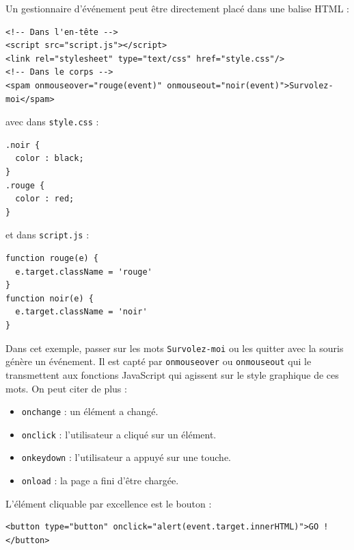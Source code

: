 Un gestionnaire d'événement peut être directement placé dans une balise HTML :

\vspace{-2ex}
\begin{verbatim}
<!-- Dans l'en-tête -->
<script src="script.js"></script>
<link rel="stylesheet" type="text/css" href="style.css"/>
<!-- Dans le corps -->
<spam onmouseover="rouge(event)" onmouseout="noir(event)">Survolez-moi</spam>
\end{verbatim}

\vspace{-2ex}
\begin{multicols}{2}
avec dans \texttt{style.css} :

\vspace{-2ex}
\begin{verbatim}
.noir { 
  color : black; 
}
.rouge { 
  color : red; 
}
\end{verbatim}


et dans \texttt{script.js} :

\vspace{-2ex}
\begin{verbatim}
function rouge(e) {
  e.target.className = 'rouge'
} 
function noir(e) {
  e.target.className = 'noir'
}
\end{verbatim}

\end{multicols}

Dans cet exemple, passer sur les mots \texttt{Survolez-moi} ou les quitter avec la souris génère un événement. Il est capté par \texttt{onmouseover} ou \texttt{onmouseout} qui le transmettent aux fonctions JavaScript qui agissent sur le style graphique de ces mots. On peut citer de plus :

\begin{itemize}
	\item \texttt{onchange} : un élément a changé.
	\item \texttt{onclick} :  l'utilisateur a cliqué sur un élément.
	\item \texttt{onkeydown} :  l'utilisateur a appuyé sur une touche.
	\item \texttt{onload} : la page a fini d'être chargée.
\end{itemize}

L'élément cliquable par excellence est le bouton :

\vspace{-2ex}
\begin{verbatim}
<button type="button" onclick="alert(event.target.innerHTML)">GO !</button>
\end{verbatim}

